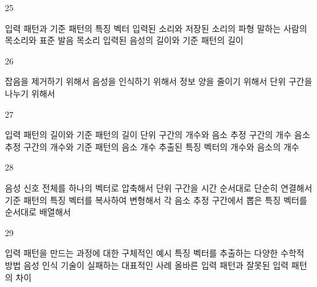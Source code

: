\documentclass[fs9,seriesRus]{korfarm-base}
\begin{document}
\begin{kfSentenceUnit}{25}{}
\begin{kfChoices}
\kfChoice 입력 패턴과 기준 패턴의 특징 벡터
\kfChoice 입력된 소리와 저장된 소리의 파형
\kfChoice 말하는 사람의 목소리와 표준 발음 목소리
\kfChoice 입력된 음성의 길이와 기준 패턴의 길이
\end{kfChoices}
\end{kfSentenceUnit}

\begin{kfSentenceUnit}{26}{}
\begin{kfChoices}
\kfChoice 잡음을 제거하기 위해서
\kfChoice 음성을 인식하기 위해서
\kfChoice 정보 양을 줄이기 위해서
\kfChoice 단위 구간을 나누기 위해서
\end{kfChoices}
\end{kfSentenceUnit}

\begin{kfSentenceUnit}{27}{}
\begin{kfChoices}
\kfChoice 입력 패턴의 길이와 기준 패턴의 길이
\kfChoice 단위 구간의 개수와 음소 추정 구간의 개수
\kfChoice 음소 추정 구간의 개수와 기준 패턴의 음소 개수
\kfChoice 추출된 특징 벡터의 개수와 음소의 개수
\end{kfChoices}
\end{kfSentenceUnit}

\begin{kfSentenceUnit}{28}{}
\begin{kfChoices}
\kfChoice 음성 신호 전체를 하나의 벡터로 압축해서
\kfChoice 단위 구간을 시간 순서대로 단순히 연결해서
\kfChoice 기준 패턴의 특징 벡터를 복사하여 변형해서
\kfChoice 각 음소 추정 구간에서 뽑은 특징 벡터를 순서대로 배열해서
\end{kfChoices}
\end{kfSentenceUnit}

\begin{kfSentenceUnit}{29}{}
\begin{kfChoices}
\kfChoice 입력 패턴을 만드는 과정에 대한 구체적인 예시
\kfChoice 특징 벡터를 추출하는 다양한 수학적 방법
\kfChoice 음성 인식 기술이 실패하는 대표적인 사례
\kfChoice 올바른 입력 패턴과 잘못된 입력 패턴의 차이
\end{kfChoices}
\end{kfSentenceUnit}
\end{document}
